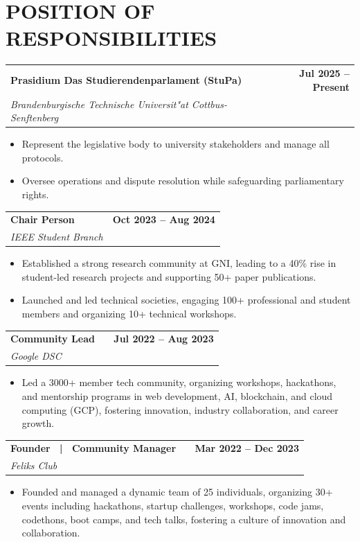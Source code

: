\documentclass[a4paper,11pt]{article}
\makeatletter
\newcommand{\entryheader}[4]{%
  \begin{tabularx}{\textwidth}{@{}>{\RaggedRight\arraybackslash}X r@{}}
    \textbf{#1} & \textbf{#2} \\
    \textit{#3} & \textit{#4} \\
  \end{tabularx}%
}
\newenvironment{entrybullets}{%
  \begin{minipage}[t]{0.77\textwidth}
    \begin{itemize}[leftmargin=*,label=\textbullet,align=left]
}{%
    \end{itemize}
  \end{minipage}
}
\newcommand{\extlink}{\raisebox{0.2ex}{\scriptsize\faExternalLink*}}
\makeatother
\begin{document}
\section*{POSITION OF RESPONSIBILITIES}
\entryheader{Prasidium Das Studierendenparlament (StuPa)}{Jul 2025 -- Present}{Brandenburgische Technische Universit"at Cottbus-Senftenberg}{}
\begin{entrybullets}
  \item Represent the legislative body to university stakeholders and manage all protocols.
  \item Oversee operations and dispute resolution while safeguarding parliamentary rights.
\end{entrybullets}

\vspace{0.25cm}
\entryheader{Chair Person}{Oct 2023 -- Aug 2024}{IEEE Student Branch}{}
\begin{entrybullets}
  \item Established a strong research community at GNI, leading to a 40\% rise in student-led research projects and supporting 50+ paper publications.
  \item Launched and led technical societies, engaging 100+ professional and student members and organizing 10+ technical workshops.
\end{entrybullets}

\vspace{0.25cm}
\newpage
\thispagestyle{secondpage}

\entryheader{Community Lead \ \extlink}{Jul 2022 -- Aug 2023}{Google DSC}{}
\begin{entrybullets}
  \item Led a 3000+ member tech community, organizing workshops, hackathons, and mentorship programs in web development, AI, blockchain, and cloud computing (GCP), fostering innovation, industry collaboration, and career growth.
\end{entrybullets}

\vspace{0.25cm}
\entryheader{Founder \ | \ Community Manager \ \extlink}{Mar 2022 -- Dec 2023}{Feliks Club}{}
\begin{entrybullets}
  \item Founded and managed a dynamic team of 25 individuals, organizing 30+ events including hackathons, startup challenges, workshops, code jams, codethons, boot camps, and tech talks, fostering a culture of innovation and collaboration.
\end{entrybullets}
\end{document}
